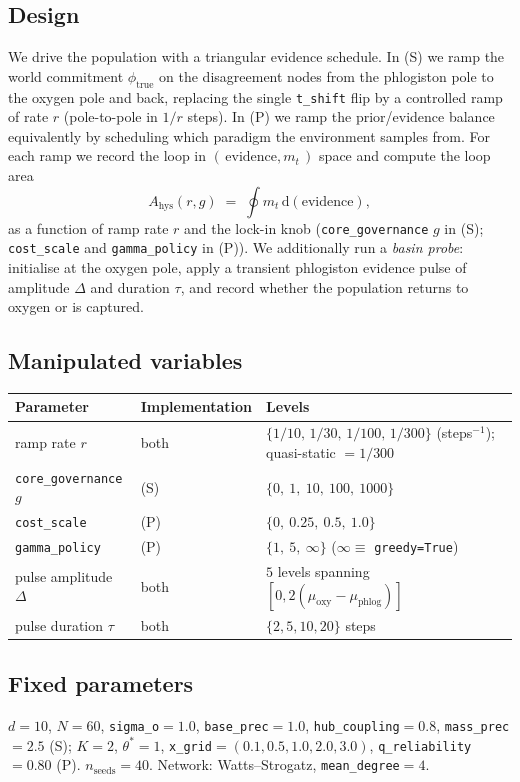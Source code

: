 \documentclass[11pt]{article}
\newcommand{\param}[1]{\texttt{#1}}
\newcommand{\thetastar}{\theta^{\!*}}
\newcommand{\mt}{m_t}
\begin{document}
\subsection{Design}
We drive the population with a triangular evidence schedule. In (S) we ramp the
world commitment $\phi_{\text{true}}$ on the disagreement nodes from the
phlogiston pole to the oxygen pole and back, replacing the single \param{t\_shift}
flip by a controlled ramp of rate $r$ (pole-to-pole in $1/r$ steps). In (P) we
ramp the prior/evidence balance equivalently by scheduling which paradigm the
environment samples from. For each ramp we record the loop in $(\,\text{evidence},
\mt\,)$ space and compute the loop area
\begin{equation}
A_{\text{hys}}(r,g) \;=\; \oint \mt \, \mathrm{d}(\text{evidence}),
\end{equation}
as a function of ramp rate $r$ and the lock-in knob (\param{core\_governance}
$g$ in (S); \param{cost\_scale} and \param{gamma\_policy} in (P)). We
additionally run a \emph{basin probe}: initialise at the oxygen pole, apply a
transient phlogiston evidence pulse of amplitude $\Delta$ and duration $\tau$,
and record whether the population returns to oxygen or is captured.

\subsection{Manipulated variables}
\begin{center}
\begin{tabular}{@{}lll@{}}
\toprule
Parameter & Implementation & Levels \\
\midrule
ramp rate $r$ & both & $\{1/10,\,1/30,\,1/100,\,1/300\}$ (steps$^{-1}$); quasi-static $=1/300$ \\
\param{core\_governance} $g$ & (S) & $\{0,\ 1,\ 10,\ 100,\ 1000\}$ \\
\param{cost\_scale} & (P) & $\{0,\ 0.25,\ 0.5,\ 1.0\}$ \\
\param{gamma\_policy} & (P) & $\{1,\ 5,\ \infty\}$ ($\infty\equiv$ \param{greedy=True}) \\
pulse amplitude $\Delta$ & both & $5$ levels spanning $[0, 2(\mu_{\text{oxy}}-\mu_{\text{phlog}})]$ \\
pulse duration $\tau$ & both & $\{2,5,10,20\}$ steps \\
\bottomrule
\end{tabular}
\end{center}

\subsection{Fixed parameters}
$d{=}10$, $N{=}60$, \param{sigma\_o}${=}1.0$, \param{base\_prec}${=}1.0$,
\param{hub\_coupling}${=}0.8$, \param{mass\_prec}${=}2.5$ (S);
$K{=}2$, $\thetastar{=}1$, \param{x\_grid}${=}(0.1,0.5,1.0,2.0,3.0)$,
\param{q\_reliability}${=}0.80$ (P). $n_{\text{seeds}}{=}40$. Network:
Watts--Strogatz, \param{mean\_degree}${=}4$.
\end{document}
